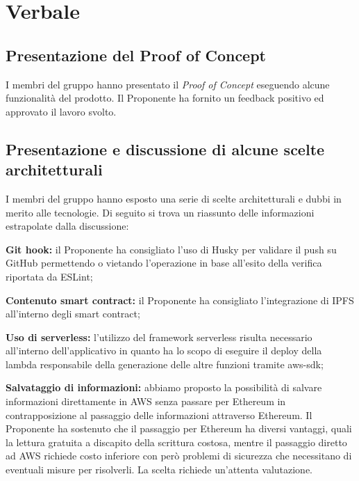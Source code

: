 \section{Verbale}
\subsection{Presentazione del Proof of Concept}
I membri del gruppo hanno presentato il \textit{Proof of Concept} eseguendo alcune funzionalità del prodotto. Il Proponente ha fornito un feedback positivo ed approvato il lavoro svolto.


\subsection{Presentazione e discussione di alcune scelte architetturali}
I membri del gruppo hanno esposto una serie di scelte architetturali e dubbi in merito alle tecnologie.
Di seguito si trova un riassunto delle informazioni estrapolate dalla discussione:
\begin{description}
	\item{\textbf{Git hook:}} il Proponente ha consigliato l'uso di Husky per validare il push su GitHub permettendo o vietando l'operazione in base all'esito della verifica riportata da ESLint;
		\item{\textbf{Contenuto smart contract:}} il Proponente ha consigliato l'integrazione di IPFS all'interno degli smart contract;
		\item{\textbf{Uso di serverless:}} l'utilizzo del framework serverless risulta necessario all'interno dell'applicativo in quanto ha lo scopo di eseguire il deploy della lambda responsabile della generazione delle altre funzioni tramite aws-sdk;
		\item{\textbf{Salvataggio di informazioni:}} abbiamo proposto la possibilità di salvare informazioni direttamente in AWS senza passare per Ethereum in contrapposizione al passaggio delle informazioni attraverso Ethereum. Il Proponente ha sostenuto che il passaggio per Ethereum ha diversi vantaggi, quali la lettura gratuita a discapito della scrittura costosa, mentre il passaggio diretto ad AWS richiede costo inferiore con però problemi di sicurezza che necessitano di eventuali misure per risolverli. La scelta richiede un'attenta valutazione.
\end{description}
